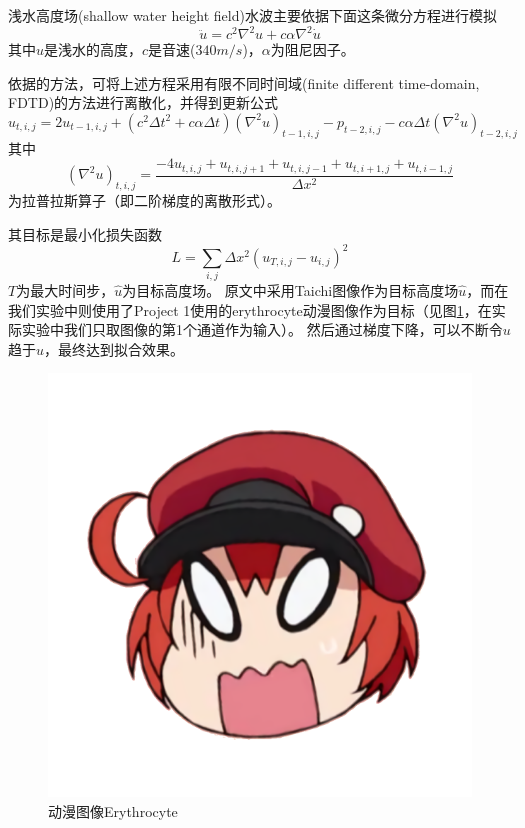 \documentclass[thesis]{thesis}
\begin{document}
浅水高度场(shallow water height field)水波主要依据下面这条微分方程进行模拟
\begin{equation}
\ddot{u}=c^{2} \nabla^{2} u+c \alpha \nabla^{2} \dot{u}
\end{equation}
其中$u$是浅水的高度，$c$是音速($340m/s$)，$\alpha$为阻尼因子。

依据\cite{wang:wave_2018}的方法，可将上述方程采用有限不同时间域(finite different time-domain, FDTD)的方法进行离散化，并得到更新公式
\begin{equation}
\label{equ:fdtd}
u_{t, i, j}=2 u_{t-1, i, j}+\left(c^{2} \Delta t^{2}+c \alpha \Delta t\right)\left(\nabla^{2} u\right)_{t-1, i, j}-p_{t-2, i, j}-c \alpha \Delta t\left(\nabla^{2} u\right)_{t-2, i, j}
\end{equation}
其中
\begin{equation}
\label{equ:laplace}
\left(\nabla^{2} u\right)_{t, i, j}=\frac{-4 u_{t, i, j}+u_{t, i, j+1}+u_{t, i, j-1}+u_{t, i+1, j}+u_{t, i-1, j}}{\Delta x^{2}}
\end{equation}
为拉普拉斯算子（即二阶梯度的离散形式）。

其目标是最小化损失函数
\begin{equation}
L=\sum_{i,j}\Delta x^2(u_{T,i,j}-\hat{u}_{i,j})^2
\end{equation}
$T$为最大时间步，$\hat{u}$为目标高度场。
原文中采用Taichi图像作为目标高度场$\hat{u}$，而在我们实验中则使用了Project 1使用的erythrocyte动漫图像作为目标（见图\ref{fig:erythrocyte}，在实际实验中我们只取图像的第1个通道作为输入）。
然后通过梯度下降，可以不断令$u$趋于$\hat{u}$，最终达到拟合效果。
\begin{figure}[!ht]
\centering
\includegraphics[width=0.33\linewidth]{fig/erythrocyte.png}
\caption{动漫图像Erythrocyte}
\label{fig:erythrocyte}
\end{figure}
\end{document}
